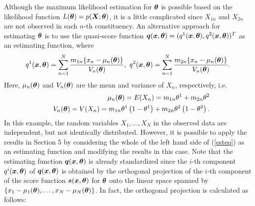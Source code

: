 \documentclass[graybox]{svmult}
\newcommand{\bm}[1]{\mbox{\boldmath $#1$}}
\begin{document}
Although the maximum likelihood estimation for $\bm{\theta}$ is possible 
based on the likelihood function $L(\bm{\theta})=p(\bm{X};\bm{\theta})$, it is a little complicated since 
$X_{1n}$ and $X_{2n}$ are not observed in each $n$-th constituency. An alternative approach for estimating 
$\bm{\theta}$ is to use the quasi-score function
$\bm{q}(\bm{x},\bm{\theta})=(q^1(\bm{x},\bm{\theta}),q^2(\bm{x},\bm{\theta}))^T$ 
\cite{MN} as an estimating function, where
%
\begin{eqnarray*}\label{conestfun}
   q^1(\bm{x},\bm{\theta}) = \sum_{n=1}^{N}\frac{m_{1n}\{x_n - \mu_n(\bm{\theta})\}}{V_n(\bm{\theta})}, \
   q^2(\bm{x},\bm{\theta}) = \sum_{n=1}^{N}\frac{m_{2n}\{x_n - \mu_n(\bm{\theta})\}}{V_n(\bm{\theta})}.
\end{eqnarray*}
%
Here, $\mu_n(\bm{\theta})$ and $V_n(\bm{\theta})$ are the mean and variance of $X_n$, respectively, i.e.
%
\begin{eqnarray}
   &&\mu_n(\bm{\theta}) = E(X_n) = m_{1n}\theta^1 + m_{2n}\theta^2 \label{mean} \\
   &&V_n(\bm{\theta}) = V(X_n) = m_{1n}\theta^1\left(1-\theta^1\right) + m_{2n}\theta^2\left(1-\theta^2\right). \nonumber
\end{eqnarray}
%
In this example, the random variables $X_1,\ldots,X_N$ in the observed data are independent, but not
identically distributed. However, it is possible to apply the results in Section 5 by considering the whole 
of the left hand side of (\ref{esteq}) as an estimating function and modifying the results in this case.
Note that the estimating function $\bm{q}(\bm{x},\bm{\theta})$ is already standardized since
the $i$-th component $q^i(\bm{x},\bm{\theta})$ of $\bm{q}(\bm{x},\bm{\theta})$ is obtained
by the orthogonal projection of the $i$-th component of the score function $\bm{s}(\bm{x},\bm{\theta})$ 
for $\bm{\theta}$ onto the linear space spanned by $\{x_1-\mu_1(\bm{\theta}),\ldots,x_N-\mu_N(\bm{\theta})\}$. 
In fact, the orthogonal projection is calculated as follows:
%
\end{document}
